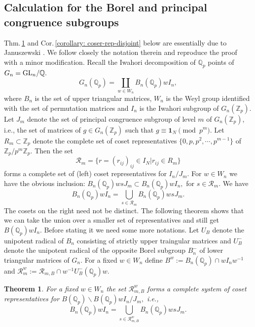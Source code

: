 \documentclass[11pt]{amsart}
\newtheorem{theorem}{Theorem}[section]
\begin{document}
\medskip
\subsection{Calculation for the Borel and principal congruence subgroups}
Thm.\,\ref{thm: coset-borel-principal} and Cor.\,\ref{corollary: coser-rep-disjoint} below are essentially due to Januszewski \cite{fabian}. 
We follow closely the notation therein and reproduce the proof with a minor modification.
Recall the Iwahori decomposition of $\mathbb{Q}_p$ points of $G_n= {\rm GL}_n/\mathbb{Q}.$
\[ G_n(\mathbb{Q}_p) = \coprod_{w \in W_n} B_n(\mathbb{Q}_p) w I_n, \]
where $B_n$ is the set of upper triangular matrices, $W_n$ is the Weyl group identified with the set of permutation matrices and 
$I_n$ is the Iwahori subgroup of $G_n(\mathbb{Z}_p).$
Let $J_m$ denote the set of principal congruence subgroup of level $m$ of $G_n(\mathbb{Z}_p)$, i.e., 
the set of matrices of $g \in G_n(\mathbb{Z}_p)$ such that $g \equiv \mathbf{1}_N \pmod{p^m}.$ 
Let $R_m \subset \mathbb{Z}_p$ denote the complete set of coset representatives $\{0,p,p^2, \cdots, p^{m-1}\}$ of $\mathbb{Z}_p/p^m\mathbb{Z}_p.$ 
Then the set 
\[ \mathcal{R}_m = \{r = (r_{ij})_{ij} \in I_N | r_{ij} \in R_m\}\]
forms a complete set of (left) coset representatives for $I_n/J_m.$ 
For $w \in W_n$ we have the obvious inclusion:
$B_n(\mathbb{Q}_p)w s J_m \subset  B_n(\mathbb{Q}_p)wI_n,$ for $s \in \mathcal{R}_m.$
We have
\[  B_n(\mathbb{Q}_p) w I_n = \bigcup_{s \in \mathcal{R}_{m}}  B_n(\mathbb{Q}_p) w s J_m.\]
The cosets on the right need not be distinct. 
The following theorem shows that we can take the union over a smaller set of representatives  
and still get $B(\mathbb{Q}_p) w I_n.$ Before stating it we need some more notations.
Let $U_B$ denote the unipotent radical of $B_n$ consisting of strictly upper traingular matrices and $U_B^{-}$ denote the unipotent radical of 
the opposite Borel subgroup $B_n^{-}$ of lower triangular matrices of $G_n$.
For a fixed $w\in W_n$ define $B^w := B_n(\mathbb{Q}_p) \cap w I_n w^{-1}$ and 
$\mathcal{R}_m^w := \mathcal{R}_{m,B} \cap w^{-1} U_B^{-}(\mathbb{Q}_p) w.$
 
\begin{theorem}
\label{thm: coset-borel-principal}
	For a fixed $w \in W_n$ the set $\mathcal{R}^w_{m,B}$ forms a complete system of coset representatives for 
	$B(\mathbb{Q}_p) \backslash B(\mathbb{Q}_p)wI_n/J_m,$ i.e.,
	\[ B_n(\mathbb{Q}_p)wI_n = \bigcup_{s \in \mathcal{R}_{m,B}^w} B_n(\mathbb{Q}_p)w s J_m.\] 
\end{theorem}
\end{document}
